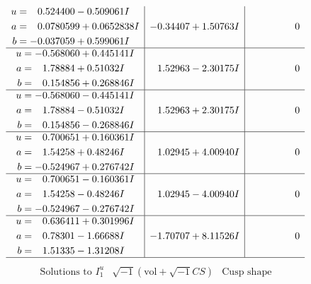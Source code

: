 \documentclass[1p]{elsarticle_modified}
\theoremstyle{definition}
\newcommand{\I}{\sqrt{-1}}
\begin{document}
$$\begin{array}{c|c|c}
\begin{aligned}
u &= \phantom{-}0.524400 - 0.509061 I \\
a &= \phantom{-}0.0780599 + 0.0652838 I \\
b &= -0.037059 + 0.599061 I\end{aligned}
 & -0.34407 + 1.50763 I & \phantom{-0.000000 } 0 \\ \hline\begin{aligned}
u &= -0.568060 + 0.445141 I \\
a &= \phantom{-}1.78884 + 0.51032 I \\
b &= \phantom{-}0.154856 + 0.268846 I\end{aligned}
 & \phantom{-}1.52963 - 2.30175 I & \phantom{-0.000000 } 0 \\ \hline\begin{aligned}
u &= -0.568060 - 0.445141 I \\
a &= \phantom{-}1.78884 - 0.51032 I \\
b &= \phantom{-}0.154856 - 0.268846 I\end{aligned}
 & \phantom{-}1.52963 + 2.30175 I & \phantom{-0.000000 } 0 \\ \hline\begin{aligned}
u &= \phantom{-}0.700651 + 0.160361 I \\
a &= \phantom{-}1.54258 + 0.48246 I \\
b &= -0.524967 + 0.276742 I\end{aligned}
 & \phantom{-}1.02945 + 4.00940 I & \phantom{-0.000000 } 0 \\ \hline\begin{aligned}
u &= \phantom{-}0.700651 - 0.160361 I \\
a &= \phantom{-}1.54258 - 0.48246 I \\
b &= -0.524967 - 0.276742 I\end{aligned}
 & \phantom{-}1.02945 - 4.00940 I & \phantom{-0.000000 } 0 \\ \hline\begin{aligned}
u &= \phantom{-}0.636411 + 0.301996 I \\
a &= \phantom{-}0.78301 - 1.66688 I \\
b &= \phantom{-}1.51335 - 1.31208 I\end{aligned}
 & -1.70707 + 8.11526 I & \phantom{-0.000000 } 0\\
 \hline 
 \end{array}$$\newpage$$\begin{array}{c|c|c}  
\text{Solutions to }I^u_{1}& \I (\text{vol} + \sqrt{-1}CS) & \text{Cusp shape}\\

\end{array}$$
\end{document}
